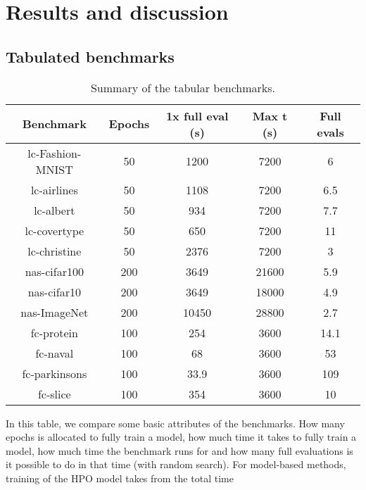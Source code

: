 \chapter{Results and discussion}

\section{Tabulated benchmarks}

\begin{table}[H]
    \centering
\begin{tabular}{ccccc}
    \hline
    \textbf{Benchmark} & \textbf{Epochs} & \textbf{1x full eval (s)} & \textbf{Max t (s)} & \textbf{Full evals} \\ \hline
    lc-Fashion-MNIST & 50 & 1200 & 7200 & 6 \\ \hline
    lc-airlines & 50  & 1108 & 7200  & 6.5 \\ \hline
    lc-albert  & 50  & 934  & 7200 & 7.7 \\ \hline
    lc-covertype  & 50  & 650  & 7200  & 11  \\ \hline
    lc-christine  & 50  & 2376  & 7200  & 3  \\ \hline
    nas-cifar100 & 200 & 3649  & 21600  & 5.9 \\ \hline
    nas-cifar10  & 200 & 3649  & 18000 & 4.9 \\ \hline
    nas-ImageNet & 200 & 10450 & 28800 & 2.7 \\ \hline
    fc-protein & 100 & 254  & 3600  & 14.1 \\ \hline
    fc-naval  & 100  & 68  & 3600  & 53 \\ \hline
    fc-parkinsons  & 100  & 33.9 & 3600  & 109 \\ \hline
    fc-slice  & 100  & 354 & 3600  & 10 \\ \hline
\end{tabular}
\caption{Summary of the tabular benchmarks.}
\end{table}


In this table, we compare some basic attributes of the benchmarks. How many epochs is allocated to fully train a model, how much time it takes to fully train a model, how much time the benchmark runs for and how many full evaluations is it possible to do in that time (with random search). For model-based methods, training of the HPO model takes from the total time

